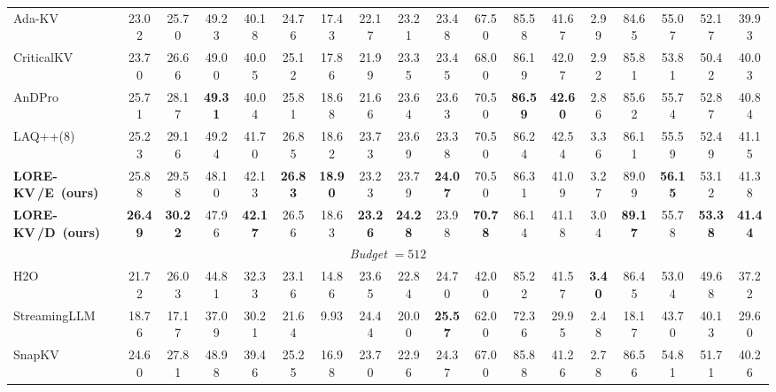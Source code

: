 \documentclass{article} %
\newcommand{\best}[1]{\textcolor{bestblue}{\textbf{#1}}}
\newcommand{\second}[1]{\textcolor{secondorange}{#1}}
\newcommand{\lorekvE}{LORE-KV\,/E}
\newcommand{\lorekvD}{LORE-KV\,/D}
\begin{document}
\begin{table}[t]
{\begin{tabular}{lccccccccccccccccc}
Ada-KV 
& 23.02 & 25.70 & \second{49.23} 
& 40.18 & 24.76 & 17.43 
& 22.17 & 23.21 & 23.48 
& 67.50 & 85.58 & 41.67 
& 2.99 & 84.65 
& 55.07 & 52.17 
& 39.93 \\

CriticalKV 
& 23.70 & 26.66 & 49.00 
& 40.05 & 25.12 & 17.86 
& 21.99 & 23.35 & 23.45 
& 68.00 & 86.19 & \second{42.07} 
& 2.92 & 85.81 
& 53.81 & 50.42 
& 40.03 \\

AnDPro 
& 25.71 & 28.17 & \best{49.31} 
& 40.04 & 25.81 & \second{18.68} 
& 21.66 & 23.64 & 23.63 
& \second{70.50} & \best{86.59} & \best{42.60} 
& 2.86 & 85.62 
& 55.74 & 52.87 
& 40.84 \\

LAQ++(8)
& 25.23 & 29.16 & 49.24 
& 41.70 & 26.85 & 18.62 
& 23.73 & 23.69 & 23.38 
& 70.50 & 86.24 & 42.54 
& 3.36 & 86.11 
& 55.59 & 52.49 
& 41.15 \\

\textbf{\lorekvE\ (ours)} 
& \second{25.88} & \second{29.58} & 48.10 
& \second{42.13} & \best{26.83} & \best{18.90} 
& \second{23.23} & \second{23.79} & \best{24.07} 
& \second{70.50} & \second{86.31} & 41.09 
& 3.27 & \second{89.09} 
& \best{56.15} & \second{53.12} 
& \second{41.38} \\

\textbf{\lorekvD\ (ours)} 
& \best{26.49} & \best{30.22} & 47.96 
& \best{42.17} & \second{26.56} & 18.63 
& \best{23.26} & \best{24.28} & \second{23.98} 
& \best{70.78} & 86.14 & 41.18 
& 3.04 & \best{89.17} 
& \second{55.78} & \best{53.38} 
& \best{41.44} \\

\midrule
\multicolumn{18}{c}{\textit{Budget} $=512$} \\
\midrule

H2O 
& 21.72 & 26.03 & 44.81 
& 32.33 & 23.16 & 14.86 
& 23.65 & 22.84 & 24.70 
& 42.00 & 85.22 & 41.57 
& \best{3.40} & 86.45 
& 53.04 & 49.68 
& 37.22 \\

StreamingLLM 
& 18.76 & 17.17 & 37.09 
& 30.21 & 21.64 & 9.93 
& 24.44 & 20.00 & \best{25.57} 
& 62.00 & 72.36 & 29.95 
& 2.48 & 18.17 
& 43.70 & 40.13 
& 29.60 \\

SnapKV 
& 24.60 & 27.81 & 48.98 
& 39.46 & 25.25 & 16.98 
& 23.70 & 22.96 & 24.37 
& 67.00 & 85.88 & 41.26 
& 2.78 & 86.56 
& 54.81 & 51.71 
& 40.26 \\


\end{tabular}}
\end{table}
\end{document}

